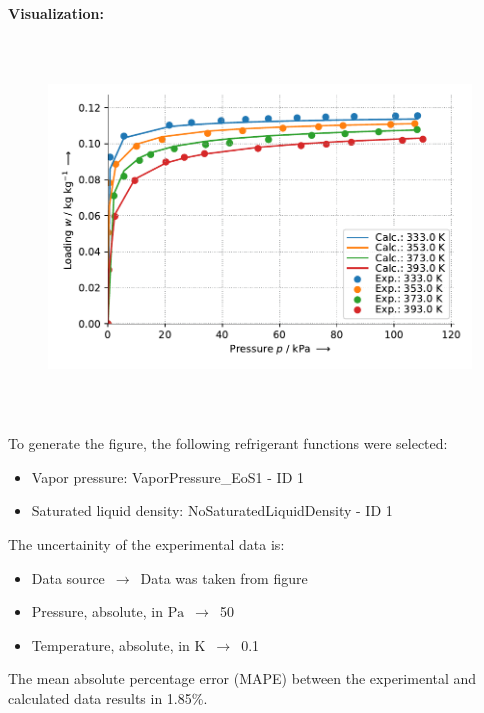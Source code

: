 \textbf{Visualization:}
%
\begin{figure}[!htp]
{\noindent\includegraphics[height=10cm, keepaspectratio]{figs/ads/ads_1-Butene_zeolite_pellet_13X_Toth_1.pdf}}
\end{figure}
%

To generate the figure, the following refrigerant functions were selected:
\begin{itemize}
\item Vapor pressure: VaporPressure\_EoS1 - ID 1
\item Saturated liquid density: NoSaturatedLiquidDensity - ID 1
\end{itemize}

The uncertainity of the experimental data is:
\begin{itemize}
\item Data source $\,\to\,$ Data was taken from figure
\item Pressure, absolute, in $\si{\pascal}$ $\,\to\,$ 50
\item Temperature, absolute, in $\si{\kelvin}$ $\,\to\,$ 0.1
\end{itemize}

The mean absolute percentage error (MAPE) between the experimental and calculated data results in 1.85\%.
\FloatBarrier
\newpage
